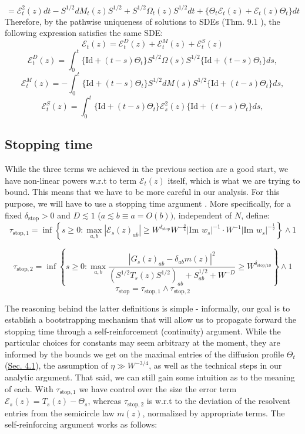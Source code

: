 \documentclass[11pt]{article}
\newcommand{\E}{\mathcal{E}}
\newcommand{\sto}{\text{stop}}
\newcommand{\im}{\text{Im }}
\begin{document}
$$= \E_t^2(z)dt - S^{1/2} dM_t(z)S^{1/2} + S^{1/2} \Omega_t(z) S^{1/2}dt + \{\Theta_t \E_t(z)+\E_t(z)\Theta_t\}dt$$
Therefore, by the pathwise uniqueness of solutions to SDEs (Thm. 9.1 \cite{steele}), the following expression satisfies the same SDE:
\begin{equation*}\E_t(z)=\E_t^{D}(z)+\E_t^{M}(z)+\E_t^{S}(z)\tag{3.3}\end{equation*}
$$\E_t^{D}(z)=\int_0^t \{\text{Id} + (t-s)\Theta_t\} S^{1/2} \Omega(s) S^{1/2} \{\text{Id} + (t-s)\Theta_t\}ds,$$
$$\E_t^{M}(z)=-\int_0^t \{\text{Id} + (t-s)\Theta_t\}S^{1/2} dM(s)S^{1/2}\{\text{Id} +(t-s)\Theta_t\}ds,$$
$$\E_t^{S}(z)=\int_0^t \{\text{Id} + (t-s)\Theta_t\}\E_s^2(z) \{\text{Id} + (t-s)\Theta_t\}ds,$$

\subsection{Stopping time}
While the three terms we achieved in the previous section are a good start, we have non-linear powers w.r.t to term $\E_t(z)$ itself, which is what we are trying to bound. This means that we have to be more careful in our analysis. For this purpose, we will have to use a stopping time argument \cite{bandSDE}. More specifically, for a fixed $\delta_\sto>0$ and $D\lesssim 1$ ($a\lesssim b\equiv a = O(b))$, independent of $N$, define:
\begin{equation*}
\tau_{\text{stop}, 1}=\inf \left\{s\geq 0: \max_{a, b} |\E_s(z)_{ab}|\geq W^{\delta_{\sto}}W^{-\frac{3}{4}}|\im w_s|^{-1}\cdot W^{-1}|\im w_s|^{-\frac{1}{2}}\right\}\wedge 1
\tag{3.4.1}
\end{equation*}

\begin{equation*}
\tau_{\text{stop}, 2}=\inf \left\{s\geq 0: \max_{a, b} 
\frac{|G_s(z)_{ab}-\delta_{ab}m(z)|^2}{(S^{1/2}T_s(z)S^{1/2})_{ab}+S_{ab}^{1/2}+W^{-D}}\geq W^{\delta_{\sto/10}}
\right\}\wedge 1
\tag{3.4.2}
\end{equation*}
\begin{equation*}
\tau_\sto = \tau_{\sto, 1}\wedge \tau_{\sto, 2}\tag{3.4.2}
\end{equation*}

\noindent The reasoning behind the latter definitions is simple - informally, our goal is to establish a bootstrapping mechanism that will allow us to propagate forward the stopping time through a self-reinforcement (continuity) argument. While the particular choices for constants may seem arbitrary at the moment, they are informed by the bounds we get on the maximal entries of the diffusion profile $\Theta_t$ (\hyperref[diffusion]{Sec. 4.1}), the assumption of $\eta\gg W^{-3/4}$, as well as the technical steps in our analytic argument. That said, we can still gain some intuition as to the meaning of each. With $\tau_{\text{stop},1}$ we have control over the size the error term $\E_s(z) = T_s(z) - \Theta_s$, whereas $\tau_{\text{stop},2}$ is w.r.t to the deviation of the resolvent entries from the semicircle law $m(z)$, normalized by appropriate terms. The self-reinforcing argument works as follows:
\end{document}
